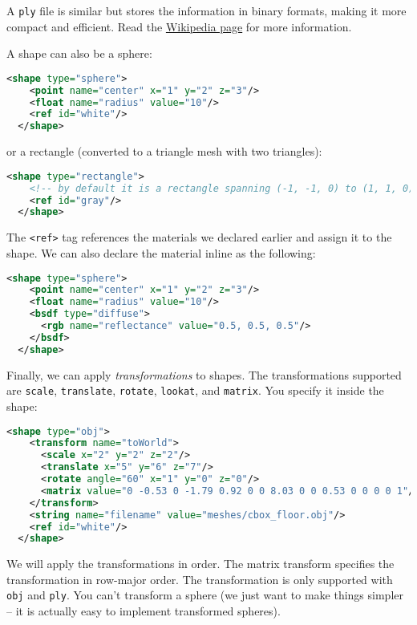 A \lstinline{ply} file is similar but stores the information in binary formats, making it more compact and efficient. Read the \href{https://en.wikipedia.org/wiki/PLY_(file_format)}{Wikipedia page} for more information.

A shape can also be a sphere:
\begin{lstlisting}[language=xml]
  <shape type="sphere">
    <point name="center" x="1" y="2" z="3"/>
    <float name="radius" value="10"/>
    <ref id="white"/>
  </shape>
\end{lstlisting}
or a rectangle (converted to a triangle mesh with two triangles):
\begin{lstlisting}[language=xml]
  <shape type="rectangle">
    <!-- by default it is a rectangle spanning (-1, -1, 0) to (1, 1, 0) -->
    <ref id="gray"/>
  </shape>
\end{lstlisting}

The \lstinline{<ref>} tag references the materials we declared earlier and assign it to the shape. We can also declare the material inline as the following:
\begin{lstlisting}[language=xml]
  <shape type="sphere">
    <point name="center" x="1" y="2" z="3"/>
    <float name="radius" value="10"/>
    <bsdf type="diffuse">
      <rgb name="reflectance" value="0.5, 0.5, 0.5"/>
    </bsdf>
  </shape>
\end{lstlisting}

Finally, we can apply \emph{transformations} to shapes. The transformations supported are \lstinline{scale}, \lstinline{translate}, \lstinline{rotate}, \lstinline{lookat}, and \lstinline{matrix}. You specify it inside the shape:
\begin{lstlisting}[language=xml]
  <shape type="obj">
    <transform name="toWorld">
      <scale x="2" y="2" z="2"/>
      <translate x="5" y="6" z="7"/>
      <rotate angle="60" x="1" y="0" z="0"/>
      <matrix value="0 -0.53 0 -1.79 0.92 0 0 8.03 0 0 0.53 0 0 0 0 1"/>
    </transform>
    <string name="filename" value="meshes/cbox_floor.obj"/>
    <ref id="white"/>
  </shape>
\end{lstlisting}
We will apply the transformations in order. The matrix transform specifies the transformation in row-major order.
The transformation is only supported with \lstinline{obj} and \lstinline{ply}. You can't transform a sphere (we just want to make things simpler -- it is actually easy to implement transformed spheres).

